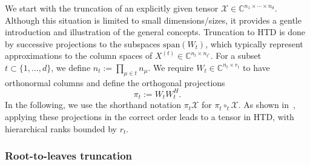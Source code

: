 \documentclass[11pt, a4paper]{article}
\newcommand{\calX}{\mathcal{X}}
\newcommand{\C}{{\mathbb C}}
\begin{document}
We start with the truncation of an explicitly given tensor $\calX \in
\C^{n_1 \times \cdots \times n_d}$.  Although this situation is
limited to small dimensions/sizes, it provides a gentle introduction
and illustration of the general concepts. Truncation to HTD is done by
successive projections to the subspaces $\text{span}(W_t)$, which
typically represent approximations to the column spaces of $X^{(t)}
\in \C^{n_t \times n_{t^c}}$. For a subset $t \subset \{1, \ldots, d\}$,
we define $n_t := \prod_{\mu \in t} n_\mu$.  We require $W_t \in
\C^{n_t \times r_t}$ to have orthonormal columns and define the
orthogonal projections 
\begin{equation} \label{eq:defproj}
\pi_t := W_t W_t^H.
\end{equation}
In the following, we use the shorthand notation $\pi_t \calX$ for
$\pi_t \circ_t \calX$. As shown in~\cite[Lemma 3.15]{Gra10}, applying
these projections in the correct order leads to a tensor in HTD, with
hierarchical ranks bounded by $r_t$.
%
\subsubsection{Root-to-leaves truncation} \label{sec:RtL}
\end{document}
